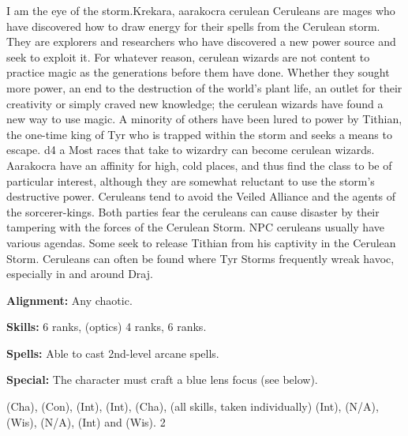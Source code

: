 {I am the eye of the storm.}{Krekara, aarakocra cerulean}
{
Ceruleans are mages who have discovered how to draw energy for their spells from the Cerulean storm. They are explorers and researchers who have discovered a new power source and seek to exploit it. For whatever reason, cerulean wizards are not content to practice magic as the generations before them have done. Whether they sought more power, an end to the destruction of the world's plant life, an outlet for their creativity or simply craved new knowledge; the cerulean wizards have found a new way to use magic. A minority of others have been lured to power by Tithian, the one-time king of Tyr who is trapped within the storm and seeks a means to escape.
}
{d4}
{a}
{
Most races that take to wizardry can become cerulean wizards. Aarakocra have an affinity for high, cold places, and thus find the class to be of particular interest, although they are somewhat reluctant to use the storm's destructive power. Ceruleans tend to avoid the Veiled Alliance and the agents of the sorcerer-kings. Both parties fear the ceruleans can cause disaster by their tampering with the forces of the Cerulean Storm. NPC ceruleans usually have various agendas. Some seek to release Tithian from his captivity in the Cerulean Storm. Ceruleans can often be found where Tyr Storms frequently wreak havoc, especially in and around Draj.
}
{
\textbf{Alignment:} Any chaotic.

\textbf{Skills:}  6 ranks,  (optics) 4 ranks,  6 ranks.


\textbf{Spells:} Able to cast 2nd-level arcane spells.

\textbf{Special:} The character must craft a blue lens focus (see below).
}
{ (Cha),  (Con),  (Int),  (Int),  (Cha),  (all skills, taken individually) (Int),  (N/A),  (Wis),  (N/A),  (Int) and  (Wis).}
{2}
{}{}
